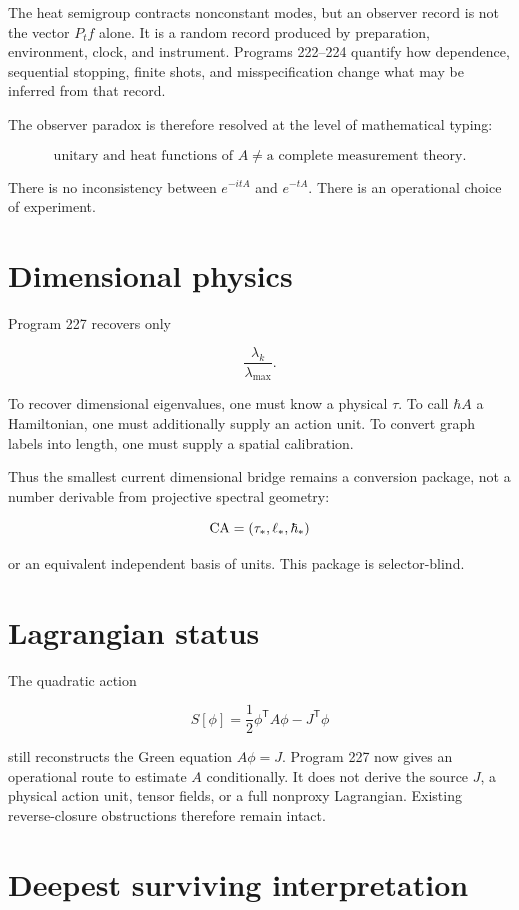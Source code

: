 \documentclass[11pt,a4paper,openany]{report}
\begin{document}
The heat semigroup contracts nonconstant modes, but an observer record is not the vector \(P_tf\) alone. It is a random record produced by preparation, environment, clock, and instrument. Programs 222--224 quantify how dependence, sequential stopping, finite shots, and misspecification change what may be inferred from that record.

The observer paradox is therefore resolved at the level of mathematical typing:

\[
\text{unitary and heat functions of }A
\ne
\text{a complete measurement theory}.
\]

There is no inconsistency between \(e^{-itA}\) and \(e^{-tA}\). There is an operational choice of experiment.

\section{Dimensional physics}

Program 227 recovers only

\[
\frac{\lambda_k}{\lambda_{\max}}.
\]

To recover dimensional eigenvalues, one must know a physical \(\tau\). To call \(\hbar A\) a Hamiltonian, one must additionally supply an action unit. To convert graph labels into length, one must supply a spatial calibration.

Thus the smallest current dimensional bridge remains a conversion package, not a number derivable from projective spectral geometry:

\[
{\rm CA}=(\tau_*,\ell_*,\hbar_*)
\]

or an equivalent independent basis of units. This package is selector-blind.

\section{Lagrangian status}

The quadratic action

\[
S[\phi]
=
\frac12\phi^\mathsf TA\phi-J^\mathsf T\phi
\]

still reconstructs the Green equation \(A\phi=J\). Program 227 now gives an operational route to estimate \(A\) conditionally. It does not derive the source \(J\), a physical action unit, tensor fields, or a full nonproxy Lagrangian. Existing reverse-closure obstructions therefore remain intact.

\section{Deepest surviving interpretation}
\end{document}
